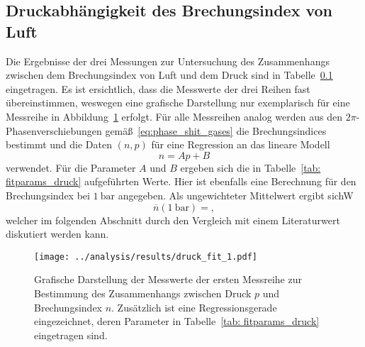 

\subsection{Druckabhängigkeit des Brechungsindex von Luft}
Die Ergebnisse der drei Messungen zur Untersuchung des Zusammenhangs zwischen dem Brechungsindex von Luft und dem Druck sind in 
Tabelle~\ref{} eingetragen. Es ist ersichtlich, dass die Messwerte der drei Reihen fast übereinstimmen, weswegen eine grafische
Darstellung nur exemplarisch für eine Messreihe in Abbildung~\ref{fig: fit_druck} erfolgt. Für alle Messreihen analog werden aus 
den $2\pi$-Phasenverschiebungen gemäß~\eqref{eq:phase_shit_gases} die Brechungsindices bestimmt und die Daten $(n, p)$ für eine Regression an 
das lineare Modell
\begin{equation}
    n = A p + B
\end{equation}
verwendet. Für die Parameter $A$ und $B$ ergeben sich die in Tabelle~\ref{tab: fitparams_druck} aufgeführten Werte. Hier ist ebenfalls eine 
Berechnung für den Brechungsindex bei $\SI{1}{\bar}$ angegeben. Als ungewichteter Mittelwert ergibt sichW
\begin{equation}
    \overline{n}\left(\SI{1}{\bar} \right) = ,
\end{equation}
welcher im folgenden Abschnitt durch den Vergleich mit einem Literaturwert%
diskutiert werden kann. 

\begin{figure}
    \centering
    \texttt{[image: ../analysis/results/druck\_fit\_1.pdf]}
    \label{fig: fit_druck}
    \caption{Grafische Darstellung der Messwerte der ersten Messreihe zur Bestimmung des Zusammenhangs zwischen 
    Druck $p$ und Brechungsindex $n$. Zusätzlich ist eine Regressionsgerade eingezeichnet, deren Parameter in 
    Tabelle~\ref{tab: fitparams_druck} eingetragen sind.}
\end{figure}







